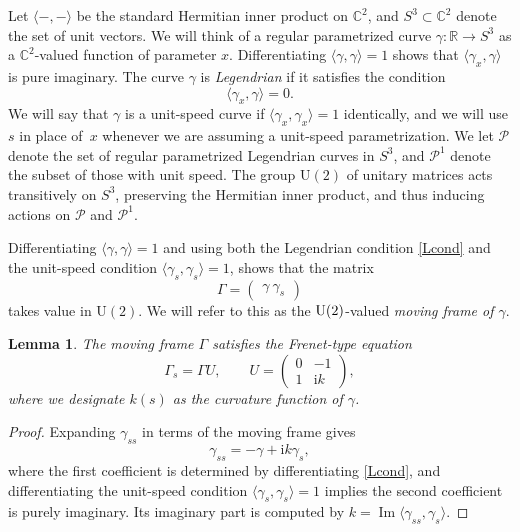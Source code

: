 \documentclass[10pt,a4paper]{amsart}
\newcommand\Leg{ {\mathcal P}} %
\newcommand\Legu{ {\mathcal P}^1} %
\newcommand\kk{k} %
\def\ri{\mathrm{i}}
\def\gam{\gamma} %
\def\C{\mathbb C}
\def\R{\mathbb R}
\newcommand\rU{\mathrm U}
\renewcommand\Im{\operatorname{Im}}
\numberwithin{equation}{section}
\newtheorem{Lemma}[Theorem]{Lemma}
\begin{document}
Let $\langle -,-\rangle$ be the standard Hermitian inner product on $\C^2$, and $S^3 \subset \C^2$ denote the set of unit vectors.
 We will think of a regular parametrized curve $\gam\colon \R \to S^3$
as a $\C^2$-valued function of parameter $x$.
Differentiating $\langle \gam, \gam\rangle=1$ shows that $\langle \gam_x, \gam\rangle$ is pure imaginary. The curve $\gam$ is {\it Legendrian} if it satisfies the condition
\begin{equation}\label{Lcond}
\langle \gam_x, \gam \rangle=0.
\end{equation}
We will say that $\gam$ is a unit-speed curve if $\langle \gam_x, \gam_x \rangle =1$ identically, and we will use $s$ in place of~$x$ whenever we are assuming a unit-speed parametrization. We let $\Leg$ denote the set of regular parametrized Legendrian curves in $S^3$, and $\Legu$ denote the subset of those with unit speed.
The group $\rU(2)$ of unitary matrices acts transitively on $S^3$,
preserving the Hermitian inner product,
and thus inducing actions on $\Leg$ and $\Legu$.

Differentiating $\langle \gam, \gam \rangle=1$ and using both the Legendrian condition \eqref{Lcond} and the unit-speed condition
$\langle \gam_s, \gam_s \rangle=1$, shows that the matrix
\[
\Gamma = \begin{pmatrix} \gam \ \gam_s \end{pmatrix}
\]
takes value in $\rU(2)$. We will refer to this as the ${\rm U}(2)$-valued {\it moving frame of $\gam$}.
\begin{Lemma}
The moving frame $\Gamma$ satisfies the Frenet-type equation
\begin{equation}\label{FrenetEquation}
\Gamma_s = \Gamma U, \qquad U = \begin{pmatrix} 0 & -1 \\ 1 & \ri \kk\end{pmatrix},
\end{equation}
where we designate $\kk(s)$ as the {\it curvature function} of $\gam$.
\end{Lemma}
\begin{proof}
Expanding $\gam_{ss}$ in terms of the moving frame gives
\begin{equation}\label{gamss}
\gam_{ss} = -\gam + \ri \kk \gam_s,
\end{equation}
where the first coefficient is determined by differentiating \eqref{Lcond}, and differentiating the unit-speed condition $\langle \gam_s, \gam_s \rangle=1$
implies the second coefficient is purely imaginary. Its imaginary part is computed by $\kk= \Im \langle \gam_{ss}, \gam_s \rangle$.
\end{proof}
\end{document}
